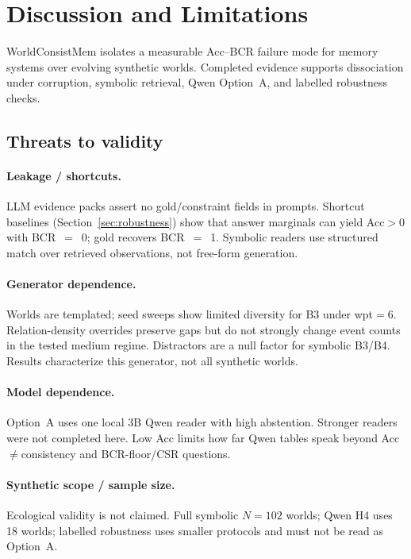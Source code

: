 \section{Discussion and Limitations}
\label{sec:discussion}

WorldConsistMem isolates a measurable Acc--BCR failure mode for memory systems over evolving synthetic worlds. Completed evidence supports dissociation under corruption, symbolic retrieval, Qwen Option~A, and labelled robustness checks.

\subsection{Threats to validity}
\label{sec:threats}

\paragraph{Leakage / shortcuts.} LLM evidence packs assert no gold/constraint fields in prompts. Shortcut baselines (Section~\ref{sec:robustness}) show that answer marginals can yield Acc$>$0 with BCR~$=$~0; gold recovers BCR~$=$~1. Symbolic readers use structured match over retrieved observations, not free-form generation.

\paragraph{Generator dependence.} Worlds are templated; seed sweeps show limited diversity for B3 under wpt$=$6. Relation-density overrides preserve gaps but do not strongly change event counts in the tested medium regime. Distractors are a null factor for symbolic B3/B4. Results characterize this generator, not all synthetic worlds.

\paragraph{Model dependence.} Option~A uses one local 3B Qwen reader with high abstention. Stronger readers were not completed here. Low Acc limits how far Qwen tables speak beyond Acc$\neq$consistency and BCR-floor/CSR questions.

\paragraph{Synthetic scope / sample size.} Ecological validity is not claimed. Full symbolic $N{=}102$ worlds; Qwen H4 uses 18 worlds; labelled robustness uses smaller protocols and must not be read as Option~A.

